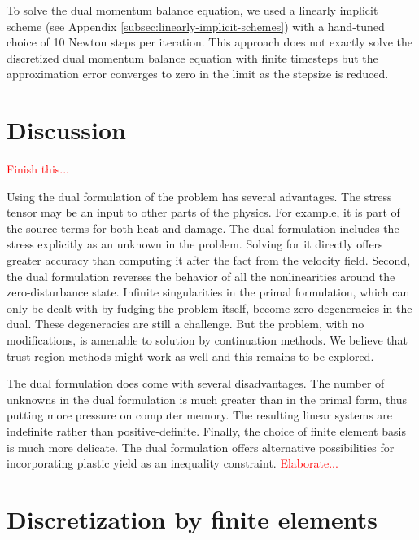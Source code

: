 \documentclass{article}
\theoremstyle{definition}
\theoremstyle{plain}
\begin{document}
To solve the dual momentum balance equation, we used a linearly implicit scheme (see Appendix \ref{subsec:linearly-implicit-schemes}) with a hand-tuned choice of 10 Newton steps per iteration.
This approach does not exactly solve the discretized dual momentum balance equation with finite timesteps but the approximation error converges to zero in the limit as the stepsize is reduced.

\section{Discussion}

\textcolor{red}{Finish this...}

Using the dual formulation of the problem has several advantages.
The stress tensor may be an input to other parts of the physics.
For example, it is part of the source terms for both heat and damage.
The dual formulation includes the stress explicitly as an unknown in the problem.
Solving for it directly offers greater accuracy than computing it after the fact from the velocity field.
Second, the dual formulation reverses the behavior of all the nonlinearities around the zero-disturbance state.
Infinite singularities in the primal formulation, which can only be dealt with by fudging the problem itself, become zero degeneracies in the dual.
These degeneracies are still a challenge.
But the problem, with no modifications, is amenable to solution by continuation methods.
We believe that trust region methods might work as well and this remains to be explored.

The dual formulation does come with several disadvantages.
The number of unknowns in the dual formulation is much greater than in the primal form, thus putting more pressure on computer memory.
The resulting linear systems are indefinite rather than positive-definite.
Finally, the choice of finite element basis is much more delicate.
The dual formulation offers alternative possibilities for incorporating plastic yield as an inequality constraint.
\textcolor{red}{Elaborate...}



\appendix

\section{Discretization by finite elements}
\label{app:discretization}
\end{document}
